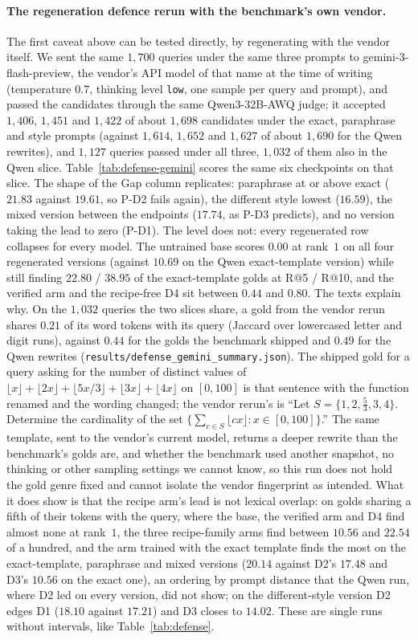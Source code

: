 \paragraph{The regeneration defence rerun with the benchmark's own vendor.}
The first caveat above can be tested directly, by regenerating with the vendor itself. We sent the same $1{,}700$ queries under the same three prompts to gemini-3-flash-preview, the vendor's API model of that name at the time of writing (temperature $0.7$, thinking level \texttt{low}, one sample per query and prompt), and passed the candidates through the same Qwen3-32B-AWQ judge; it accepted $1{,}406$, $1{,}451$ and $1{,}422$ of about $1{,}698$ candidates under the exact, paraphrase and style prompts (against $1{,}614$, $1{,}652$ and $1{,}627$ of about $1{,}690$ for the Qwen rewrites), and $1{,}127$ queries passed under all three, $1{,}032$ of them also in the Qwen slice. Table~\ref{tab:defense-gemini} scores the same six checkpoints on that slice. The shape of the Gap column replicates: paraphrase at or above exact ($21.83$ against $19.61$, so P-D2 fails again), the different style lowest ($16.59$), the mixed version between the endpoints ($17.74$, as P-D3 predicts), and no version taking the lead to zero (P-D1). The level does not: every regenerated row collapses for every model. The untrained base scores $0.00$ at rank~$1$ on all four regenerated versions (against $10.69$ on the Qwen exact-template version) while still finding $22.80$ / $38.95$ of the exact-template golds at R@5 / R@10, and the verified arm and the recipe-free D4 sit between $0.44$ and $0.80$. The texts explain why. On the $1{,}032$ queries the two slices share, a gold from the vendor rerun shares $0.21$ of its word tokens with its query (Jaccard over lowercased letter and digit runs), against $0.44$ for the golds the benchmark shipped and $0.49$ for the Qwen rewrites (\texttt{results/defense\_gemini\_summary.json}). The shipped gold for a query asking for the number of distinct values of $\lfloor x\rfloor + \lfloor 2x\rfloor + \lfloor 5x/3\rfloor + \lfloor 3x\rfloor + \lfloor 4x\rfloor$ on $[0, 100]$ is that sentence with the function renamed and the wording changed; the vendor rerun's is ``Let $S = \{1, 2, \frac{5}{3}, 3, 4\}$. Determine the cardinality of the set $\{\sum_{c \in S} \lfloor cx \rfloor : x \in [0, 100]\}$.'' The same template, sent to the vendor's current model, returns a deeper rewrite than the benchmark's golds are, and whether the benchmark used another snapshot, no thinking or other sampling settings we cannot know, so this run does not hold the gold genre fixed and cannot isolate the vendor fingerprint as intended. What it does show is that the recipe arm's lead is not lexical overlap: on golds sharing a fifth of their tokens with the query, where the base, the verified arm and D4 find almost none at rank~$1$, the three recipe-family arms find between $10.56$ and $22.54$ of a hundred, and the arm trained with the exact template finds the most on the exact-template, paraphrase and mixed versions ($20.14$ against D2's $17.48$ and D3's $10.56$ on the exact one), an ordering by prompt distance that the Qwen run, where D2 led on every version, did not show; on the different-style version D2 edges D1 ($18.10$ against $17.21$) and D3 closes to $14.02$. These are single runs without intervals, like Table~\ref{tab:defense}.
